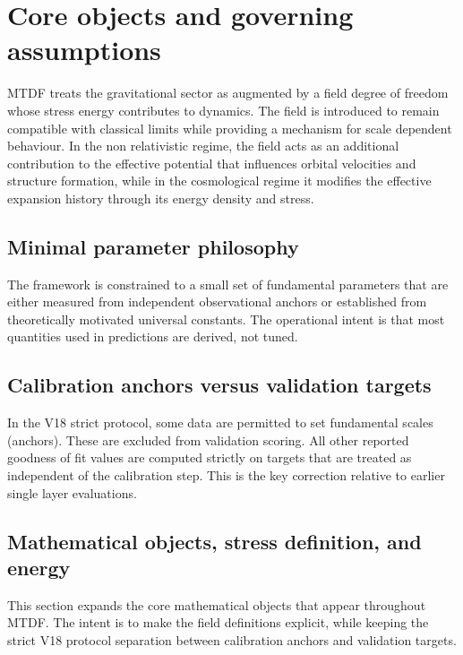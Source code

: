 \documentclass[11pt,a4paper]{article}
\begin{document}
\section{Core objects and governing assumptions}
\label{sec:sec2}
MTDF treats the gravitational sector as augmented by a field degree of freedom whose stress energy contributes to dynamics. The field is introduced to remain compatible with classical limits while providing a mechanism for scale dependent behaviour. In the non relativistic regime, the field acts as an additional contribution to the effective potential that influences orbital velocities and structure formation, while in the cosmological regime it modifies the effective expansion history through its energy density and stress.

\subsection{Minimal parameter philosophy}
The framework is constrained to a small set of fundamental parameters that are either measured from independent observational anchors or established from theoretically motivated universal constants. The operational intent is that most quantities used in predictions are derived, not tuned.

\subsection{Calibration anchors versus validation targets}
In the V18 strict protocol, some data are permitted to set fundamental scales (anchors). These are excluded from validation scoring. All other reported goodness of fit values are computed strictly on targets that are treated as independent of the calibration step. This is the key correction relative to earlier single layer evaluations.

\subsection{Mathematical objects, stress definition, and energy}
This section expands the core mathematical objects that appear throughout MTDF. The intent is to make the field definitions explicit, while keeping the strict V18 protocol separation between calibration anchors and validation targets.
\end{document}
